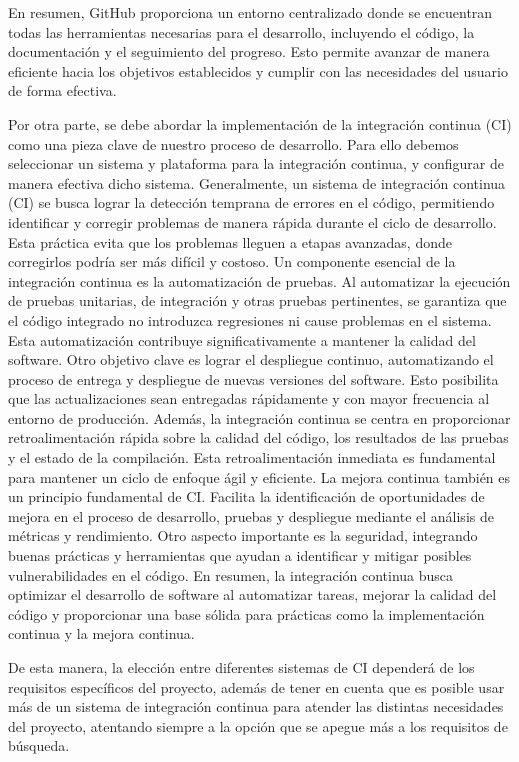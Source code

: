 En resumen, GitHub proporciona un entorno centralizado donde se encuentran todas las herramientas necesarias para el desarrollo, incluyendo el código, la documentación y el seguimiento del progreso. Esto permite avanzar de manera eficiente hacia los objetivos establecidos y cumplir con las necesidades del usuario de forma efectiva.

Por otra parte, se debe abordar la implementación de la integración continua (CI) \cite{CI_supp} como una pieza 
clave de nuestro proceso de desarrollo. Para ello debemos seleccionar un sistema y plataforma para la integración 
continua, y configurar de manera efectiva dicho sistema. Generalmente, un sistema de integración continua (CI) se busca 
lograr la detección temprana de errores en el código, permitiendo identificar y corregir problemas de manera rápida 
durante el ciclo de desarrollo. Esta práctica evita que los problemas lleguen a etapas avanzadas, donde corregirlos podría 
ser más difícil y costoso. Un componente esencial de la integración continua es la automatización de pruebas. Al 
automatizar la ejecución de pruebas unitarias, de integración y otras pruebas pertinentes, se garantiza que el código 
integrado no introduzca regresiones ni cause problemas en el sistema. Esta automatización contribuye significativamente a 
mantener la calidad del software. Otro objetivo clave es lograr el despliegue continuo, automatizando el proceso de 
entrega y despliegue de nuevas versiones del software. Esto posibilita que las actualizaciones sean entregadas rápidamente 
y con mayor frecuencia al entorno de producción. Además, la integración continua se centra en proporcionar 
retroalimentación rápida sobre la calidad del código, los resultados de las pruebas y el estado de la compilación. Esta 
retroalimentación inmediata es fundamental para mantener un ciclo de enfoque ágil y eficiente. La mejora continua también 
es un principio fundamental de CI. Facilita la identificación de oportunidades de mejora en el proceso de desarrollo, 
pruebas y despliegue mediante el análisis de métricas y rendimiento. Otro aspecto importante es la seguridad, integrando 
buenas prácticas y herramientas que ayudan a identificar y mitigar posibles vulnerabilidades en el código. En resumen, la 
integración continua busca optimizar el desarrollo de software al automatizar tareas, mejorar la calidad del código y 
proporcionar una base sólida para prácticas como la implementación continua y la mejora continua.

De esta manera, la elección entre diferentes sistemas de CI dependerá de los requisitos específicos del proyecto, además 
de tener en cuenta que es posible usar más de un sistema de integración continua para atender las distintas necesidades 
del proyecto, atentando siempre a la opción que se apegue más a los requisitos de búsqueda.

